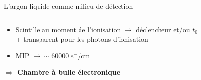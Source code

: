 \begin{frame}{L'argon liquide comme milieu de détection}
\begin{scriptsize}
\begin{columns}
\begin{column}{0.4\textwidth}
\begin{itemize}
           				\item Scintille au moment de l'ionisation $\rightarrow$ déclencheur et/ou $t_0$ \\ + transparent pour les photons  d'ionisation
         				\item MIP $\rightarrow\sim\SI{60000}{e^-\per\centi\meter}$
           			\end{itemize}
           			\begin{footnotesize}
       	    			\textbf{$\Rightarrow$ Chambre à bulle électronique}
       	    		\end{footnotesize}
           		\end{column}
           	\end{columns}
        \end{scriptsize}
    \end{frame}

